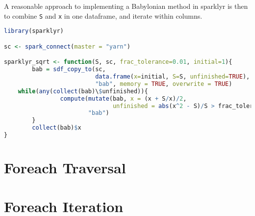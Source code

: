 \documentclass[10pt,a4paper]{article}
\begin{document}
A reasonable approach to implementing a Babylonian method in sparklyr is then
to combine \texttt{S} and \texttt{x} in one dataframe, and iterate within
columns.

\begin{lstlisting}[language=R, caption={Babylonian method implementation using sparklyr}, label=lst:sparklyr-bab]
library(sparklyr)

sc <- spark_connect(master = "yarn")

sparklyr_sqrt <- function(S, sc, frac_tolerance=0.01, initial=1){
        bab = sdf_copy_to(sc,
                          data.frame(x=initial, S=S, unfinished=TRUE),
                          "bab", memory = TRUE, overwrite = TRUE)
	while(any(collect(bab)\$unfinished)){
                compute(mutate(bab, x = (x + S/x)/2,
                               unfinished = abs(x^2 - S)/S > frac_tolerance),
                        "bab")
        }
        collect(bab)$x
}
\end{lstlisting}


\section{Foreach Traversal}

\section{Foreach Iteration}\label{sec:for-iter}

\printbibliography{}
\end{document}
